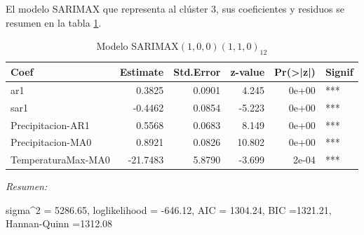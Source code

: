 \documentclass[12pt,oneside]{book}\usepackage[]{graphicx}\usepackage[]{color}
\newenvironment{knitrout}{}{} %
\theoremstyle{definition} %
\begin{document}
El modelo SARIMAX que representa al clúster 3, sus coeficientes y residuos se resumen en la tabla \ref{tab:sarimax_cl3}.




\begin{knitrout}
\color{fgcolor}\begin{table}

\caption{\label{tab:unnamed-chunk-106}\label{tab:sarimax_cl3}Modelo SARIMAX$(1,0,0)(1,1,0)_{12}$}
\centering
\begin{threeparttable}
\begin{tabular}[t]{lrrrrl}
\toprule
Coef & Estimate & Std.Error & z-value & Pr(>|z|) & Signif\\
\midrule
\rowcolor{gray!6}  ar1 & 0.3825 & 0.0901 & 4.245 & 0e+00 & ***\\
sar1 & -0.4462 & 0.0854 & -5.223 & 0e+00 & ***\\
\rowcolor{gray!6}  Precipitacion-AR1 & 0.5568 & 0.0683 & 8.149 & 0e+00 & ***\\
Precipitacion-MA0 & 0.8921 & 0.0826 & 10.802 & 0e+00 & ***\\
\rowcolor{gray!6}  TemperaturaMax-MA0 & -21.7483 & 5.8790 & -3.699 & 2e-04 & ***\\
\bottomrule
\end{tabular}
\begin{tablenotes}
\item \textit{Resumen:} 
\item sigma\textasciicircum{}2 = 5286.65, loglikelihood = -646.12, AIC = 1304.24, BIC =1321.21, Hannan-Quinn =1312.08
\end{tablenotes}
\end{threeparttable}
\end{table}


\end{knitrout}
\end{document}
